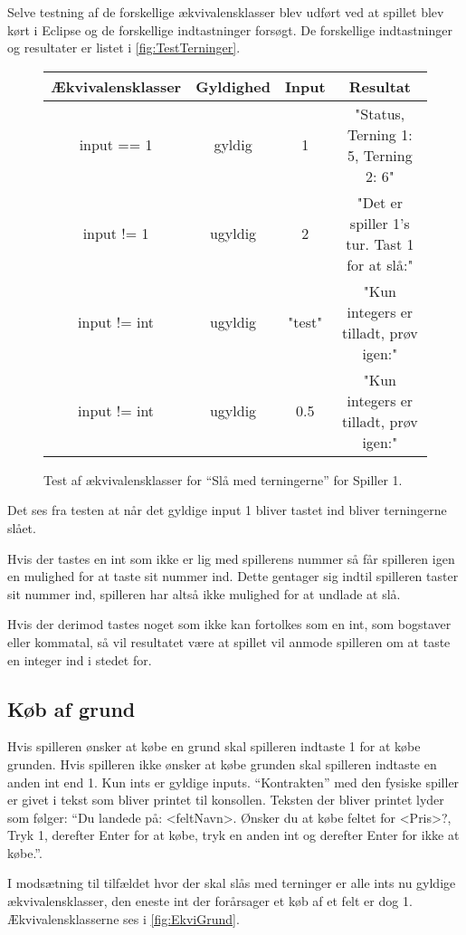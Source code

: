 Selve testning af de forskellige ækvivalensklasser blev udført ved at spillet blev kørt i Eclipse og de forskellige indtastninger forsøgt. De forskellige indtastninger og resultater er listet i \vref{fig:TestTerninger}.

\begin{figure}
\caption{Test af ækvivalensklasser for \enquote{Slå med terningerne} for Spiller 1.}
\label{fig:TestTerninger}
\centering
\begin{tabular}{cccc}
Ækvivalensklasser & Gyldighed & Input  & Resultat \\
\hline
input == 1 & gyldig & 1 & "Status, Terning 1: 5, Terning 2: 6"\\ 
input != 1 & ugyldig & 2 & "Det er spiller 1's tur. Tast 1 for at slå:"\\ 
input != int & ugyldig & "test" & "Kun integers er tilladt, prøv igen:"\\
input != int & ugyldig & 0.5 & "Kun integers er tilladt, prøv igen:" \\
\end{tabular} 
\end{figure}

Det ses fra testen at når det gyldige input 1 bliver tastet ind bliver terningerne slået.

Hvis der tastes en int som ikke er lig med spillerens nummer så får spilleren igen en mulighed for at taste sit nummer ind. Dette gentager sig indtil spilleren taster sit nummer ind, spilleren har altså ikke mulighed for at undlade at slå.

Hvis der derimod tastes noget som ikke kan fortolkes som en int, som bogstaver eller kommatal, så vil resultatet være at spillet vil anmode spilleren om at taste en integer ind i stedet for.

\subsection{Køb af grund}
Hvis spilleren ønsker at købe en grund skal spilleren indtaste 1 for at købe grunden. Hvis spilleren ikke ønsker at købe grunden skal spilleren indtaste en anden int end 1. Kun ints er gyldige inputs. \enquote{Kontrakten} med den fysiske spiller er givet i tekst som bliver printet til konsollen. Teksten der bliver printet lyder som følger: \enquote{Du landede på: <feltNavn>. Ønsker du at købe feltet for <Pris>?, Tryk 1, derefter Enter for at købe, tryk en anden int og derefter Enter for ikke at købe.}.

I modsætning til tilfældet hvor der skal slås med terninger er alle ints nu gyldige ækvivalensklasser, den eneste int der forårsager et køb af et felt er dog 1. Ækvivalensklasserne ses i \vref{fig:EkviGrund}.

